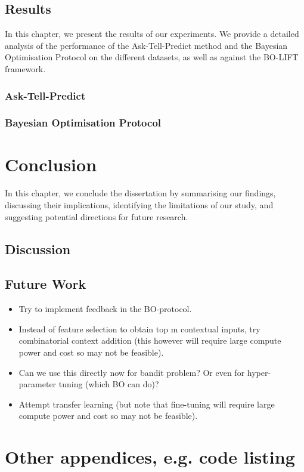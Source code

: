 \documentclass{report}
\begin{document}
\section{Results}
In this chapter, we present the results of our experiments. We provide a detailed analysis of the performance of the Ask-Tell-Predict method and the Bayesian Optimisation Protocol on the different datasets, as well as against the BO-LIFT framework.
\subsection{Ask-Tell-Predict}
\subsection{Bayesian Optimisation Protocol}
\chapter{Conclusion}
In this chapter, we conclude the dissertation by summarising our findings, discussing their implications, identifying the limitations of our study, and suggesting potential directions for future research.
\section{Discussion}
\section{Future Work}
\begin{itemize}
	\item Try to implement feedback in the BO-protocol.
	\item Instead of feature selection to obtain top m contextual inputs, try combinatorial context addition (this however will require large compute power and cost so may not be feasible).
	\item Can we use this directly now for bandit problem? Or even for hyper-parameter tuning (which BO can do)?
	\item Attempt transfer learning (but note that fine-tuning will require large compute power and cost so may not be feasible).
\end{itemize}
\appendix
\newpage
\printbibliography
\chapter{Other appendices, e.g. code listing}
\end{document}
